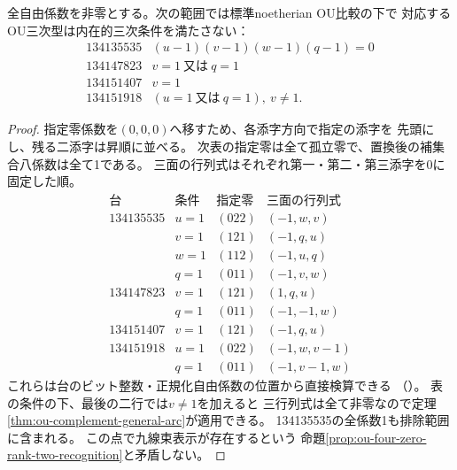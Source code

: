 \begin{theorem}[四零の補集合による境界排除]
\label{thm:ou-four-zero-complement-boundaries}
全自由係数を非零とする。次の範囲では標準noetherian OU比較の下で
対応するOU三次型は内在的三次条件を満たさない：
\[
\begin{array}{r|l}
134135535& (u-1)(v-1)(w-1)(q-1)=0\\
134147823& v=1\ \text{又は}\ q=1\\
134151407& v=1\\
134151918& (u=1\ \text{又は}\ q=1),\ v\ne1.
\end{array}
\]
\end{theorem}
\begin{proof}
指定零係数を$(0,0,0)$へ移すため、各添字方向で指定の添字を
先頭にし、残る二添字は昇順に並べる。
次表の指定零は全て孤立零で、置換後の補集合八係数は全て1である。
三面の行列式はそれぞれ第一・第二・第三添字を0に固定した順。
\[
\begin{array}{r|c|c|c}
\text{台}&\text{条件}&\text{指定零}&\text{三面の行列式}\\\hline
134135535&u=1&(022)&(-1,w,v)\\
&v=1&(121)&(-1,q,u)\\
&w=1&(112)&(-1,u,q)\\
&q=1&(011)&(-1,v,w)\\
134147823&v=1&(121)&(1,q,u)\\
&q=1&(011)&(-1,-1,w)\\
134151407&v=1&(121)&(-1,q,u)\\
134151918&u=1&(022)&(-1,w,v-1)\\
&q=1&(011)&(-1,v-1,w)
\end{array}
\]
これらは台のビット整数・正規化自由係数の位置から直接検算できる
（）。
表の条件の下、最後の二行では$v\ne1$を加えると
三行列式は全て非零なので定理\ref{thm:ou-complement-general-arc}が適用できる。
134135535の全係数1も排除範囲に含まれる。
この点で九線束表示が存在するという
命題\ref{prop:ou-four-zero-rank-two-recognition}と矛盾しない。
\end{proof}

